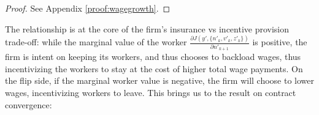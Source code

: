 \begin{proof}
  See Appendix \ref{proof:wagegrowth}.
\end{proof}
The relationship is at the core of the firm's insurance vs incentive provision trade-off: while the marginal value of the worker $\frac{\partial J(y',\{n'_k,v'_k,z'_k\})}{\partial n'_{k+1}}$ is positive, the firm is intent on keeping its workers, and thus chooses to backload wages, thus incentivizing the workers to stay at the cost of higher total wage payments. On the flip side, if the marginal worker value is negative, the firm will choose to lower wages, incentivizing workers to leave. This brings us to the result on contract convergence:
 

